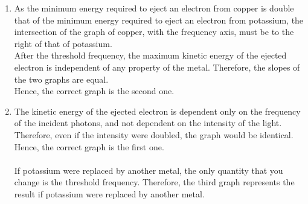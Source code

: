 \documentclass[fleqn, a4paper, 11pt, oneside]{amsart}
\theoremstyle{definition}
\theoremstyle{theorem}
\begin{document}
\begin{solution}
	\begin{enumerate}
		\item
			As the minimum energy required to eject an electron from copper is double that of the minimum energy required to eject an electron from potassium, the intersection of the graph of copper, with the frequency axis, must be to the right of that of potassium.\\
			After the threshold frequency, the maximum kinetic energy of the ejected electron is independent of any property of the metal.
			Therefore, the slopes of the two graphs are equal.\\
			Hence, the correct graph is the second one.
		\item
			The kinetic energy of the ejected electron is dependent only on the frequency of the incident photons, and not dependent on the intensity of the light.
			Therefore, even if the intensity were doubled, the graph would be identical.
			Hence, the correct graph is the first one.\\
			~\\
			If potassium were replaced by another metal, the only quantity that you change is the threshold frequency.
			Therefore, the third graph represents the result if potassium were replaced by another metal.
	\end{enumerate}
\end{solution}
\end{document}
